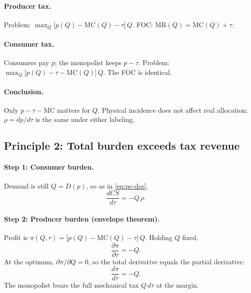 \documentclass[11pt]{article}
\begin{document}
\paragraph{Producer tax.}
Problem: $\max_Q \bigl[p(Q) - \mathrm{MC}(Q) - \tau\bigr]\,Q$.
FOC: $\mathrm{MR}(Q) = \mathrm{MC}(Q) + \tau$.

\paragraph{Consumer tax.}
Consumers pay $p$; the monopolist keeps $p - \tau$.  Problem:
$\max_Q \bigl[p(Q) - \tau - \mathrm{MC}(Q)\bigr]\,Q$.
The FOC is identical.

\paragraph{Conclusion.}
Only $p - \tau - \mathrm{MC}$ matters for $Q$.  Physical incidence does not
affect real allocation; $\rho = dp/d\tau$ is the same under either labeling.

\subsection{Principle 2: Total burden exceeds tax revenue}

\paragraph{Step 1: Consumer burden.}
Demand is still $Q = D(p)$, so as in \eqref{eq:pc-dcs},
\begin{equation}
  \frac{dCS}{d\tau} = -Q\,\rho.
  \label{eq:mono-dcs}
\end{equation}

\paragraph{Step 2: Producer burden (envelope theorem).}
Profit is $\pi(Q,\tau) = \bigl[p(Q) - \mathrm{MC}(Q) - \tau\bigr]\,Q$.
Holding $Q$ fixed,
\[
  \frac{\partial \pi}{\partial \tau} = -Q.
\]
At the optimum, $\partial\pi/\partial Q = 0$, so the total derivative
equals the partial derivative:
\begin{equation}
  \frac{d\pi}{d\tau} = -Q.
  \label{eq:mono-dpi}
\end{equation}
The monopolist bears the full mechanical tax $Q\,d\tau$ at the margin.
\end{document}

